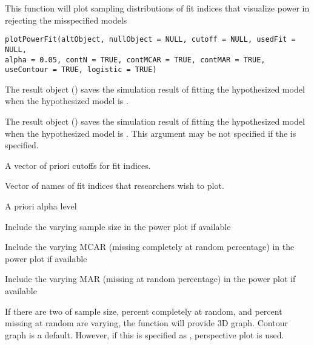 \documentclass[a4paper]{book}
\begin{document}
%
\begin{Description}\relax
This function will plot sampling distributions of fit indices that visualize power in rejecting the misspecified models
\end{Description}
%
\begin{Usage}
\begin{verbatim}
plotPowerFit(altObject, nullObject = NULL, cutoff = NULL, usedFit = NULL, 
alpha = 0.05, contN = TRUE, contMCAR = TRUE, contMAR = TRUE, 
useContour = TRUE, logistic = TRUE)
\end{verbatim}
\end{Usage}
%
\begin{Arguments}
\begin{ldescription}
\item[\code{altObject}] 
The result object () saves the simulation result of fitting the hypothesized model when the hypothesized model is .

\item[\code{nullObject}] 
The result object () saves the simulation result of fitting the hypothesized model when the hypothesized model is . This argument may be not specified if the  is specified.

\item[\code{cutoff}] 
A vector of priori cutoffs for fit indices.

\item[\code{usedFit}] 
Vector of names of fit indices that researchers wish to plot.

\item[\code{alpha}] 
A priori alpha level

\item[\code{contN}] 
Include the varying sample size in the power plot if available

\item[\code{contMCAR}] 
Include the varying MCAR (missing completely at random percentage) in the power plot if available

\item[\code{contMAR}] 
Include the varying MAR (missing at random percentage) in the power plot if available

\item[\code{useContour}] 
If there are two of sample size, percent completely at random, and percent missing at random are varying, the  function will provide 3D graph. Contour graph is a default. However, if this is specified as , perspective plot is used.


\end{ldescription}
\end{Arguments}
\end{document}
